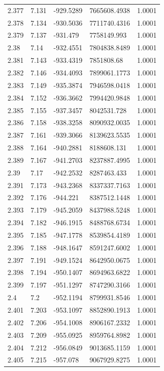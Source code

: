 \begin{tabular}{lllll}
2.377 & 7.131 & -929.5289 & 7665608.4938 & 1.0001 \\
2.378 & 7.134 & -930.5036 & 7711740.4316 & 1.0001 \\
2.379 & 7.137 & -931.479 & 7758149.993 & 1.0001 \\
2.38 & 7.14 & -932.4551 & 7804838.8489 & 1.0001 \\
2.381 & 7.143 & -933.4319 & 7851808.68 & 1.0001 \\
2.382 & 7.146 & -934.4093 & 7899061.1773 & 1.0001 \\
2.383 & 7.149 & -935.3874 & 7946598.0418 & 1.0001 \\
2.384 & 7.152 & -936.3662 & 7994420.9848 & 1.0001 \\
2.385 & 7.155 & -937.3457 & 8042531.728 & 1.0001 \\
2.386 & 7.158 & -938.3258 & 8090932.0035 & 1.0001 \\
2.387 & 7.161 & -939.3066 & 8139623.5535 & 1.0001 \\
2.388 & 7.164 & -940.2881 & 8188608.131 & 1.0001 \\
2.389 & 7.167 & -941.2703 & 8237887.4995 & 1.0001 \\
2.39 & 7.17 & -942.2532 & 8287463.433 & 1.0001 \\
2.391 & 7.173 & -943.2368 & 8337337.7163 & 1.0001 \\
2.392 & 7.176 & -944.221 & 8387512.1448 & 1.0001 \\
2.393 & 7.179 & -945.2059 & 8437988.5248 & 1.0001 \\
2.394 & 7.182 & -946.1915 & 8488768.6734 & 1.0001 \\
2.395 & 7.185 & -947.1778 & 8539854.4189 & 1.0001 \\
2.396 & 7.188 & -948.1647 & 8591247.6002 & 1.0001 \\
2.397 & 7.191 & -949.1524 & 8642950.0675 & 1.0001 \\
2.398 & 7.194 & -950.1407 & 8694963.6822 & 1.0001 \\
2.399 & 7.197 & -951.1297 & 8747290.3166 & 1.0001 \\
2.4 & 7.2 & -952.1194 & 8799931.8546 & 1.0001 \\
2.401 & 7.203 & -953.1097 & 8852890.1913 & 1.0001 \\
2.402 & 7.206 & -954.1008 & 8906167.2332 & 1.0001 \\
2.403 & 7.209 & -955.0925 & 8959764.8982 & 1.0001 \\
2.404 & 7.212 & -956.0849 & 9013685.1159 & 1.0001 \\
2.405 & 7.215 & -957.078 & 9067929.8275 & 1.0001 \\

\end{tabular}
